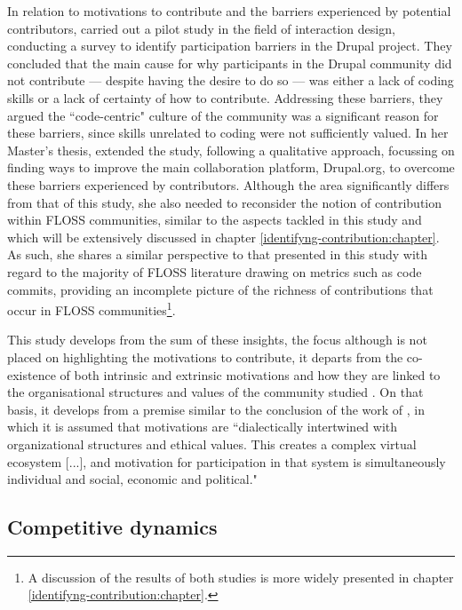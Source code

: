 In relation to motivations to contribute and the barriers experienced by potential contributors, \textcite{nordin2013development} carried out a pilot study in the field of interaction design, conducting a survey to identify participation barriers in the Drupal project. They concluded that the main cause for why participants in the Drupal community did not contribute  --- despite having the desire to do so ---  was either a lack of coding skills or a lack of certainty of how to contribute. Addressing these barriers, they argued the ``code-centric" culture of the community was a significant reason for these barriers, since skills unrelated to coding were not sufficiently valued. In her Master's thesis, \textcite{nordinmotivation2014} extended the study, following a qualitative approach, focussing on finding ways to improve the main collaboration platform, Drupal.org, to overcome these barriers experienced by contributors.  Although the area significantly differs from that of this study, she also needed to reconsider the notion of contribution within FLOSS communities, similar to the aspects tackled in this study and which will be extensively discussed in chapter \ref{identifyng-contribution:chapter}. As such, she shares a similar perspective to that presented in this study with regard to the majority of FLOSS literature drawing on metrics such as code commits, providing an incomplete picture of the richness of contributions that occur in FLOSS communities\footnote{A discussion of the results of both studies is more widely presented in chapter \ref{identifyng-contribution:chapter}.}.

This study develops from the sum of these insights, the focus although is not placed on highlighting the motivations to contribute, it departs from the co-existence of both intrinsic and extrinsic motivations and how they are linked to the organisational structures and values of the community studied \parencite{kolarec2013social}. On that basis, it develops from a premise similar to the conclusion of the work of \textcite[7]{kolarec2013social}, in which it is assumed that motivations are ``dialectically intertwined with organizational  structures  and  ethical  values. This creates  a complex virtual ecosystem [...], and motivation for participation in that system is simultaneously individual and social, economic and political."

\subsection{Competitive dynamics}

